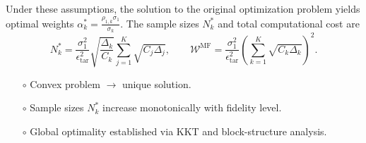 \documentclass{beamer}
\begin{document}
\begin{frame}[t]
{\begin{theorem}
        \vspace{-3mm}
        Under these assumptions, the solution to the original optimization problem  yields optimal weights $\alpha_k^*=\frac{\rho_{1,k}\sigma_1}{\sigma_k}$.
        The sample sizes $N_k^*$ and total computational cost are
        \vspace{-3mm}
        \[
        N_k^*=\frac{\sigma_1^2}{\epsilon_\text{tar}^2}\sqrt{\frac{\Delta_{k}}{C_k}}\sum_{j=1}^K\sqrt{C_j\Delta_{j}}, \qquad \mathcal{W}^\text{MF} = \frac{\sigma_1^2}{\epsilon_{\text{tar}}^2}\left(\sum_{k=1}^K\sqrt{C_k\Delta_{k}}\right)^2.
        \] 
        \end{theorem}
        }
        {\footnotesize
        \begin{itemize}[leftmargin=5pt] 
            \item[$\circ$] Convex problem $\rightarrow$ unique solution.
            \item[$\circ$] Sample sizes $N_k^*$ increase monotonically with fidelity level.
            \item[$\circ$] Global optimality established via KKT and block-structure analysis.
        \end{itemize}
        }
\end{frame}
\end{document}

